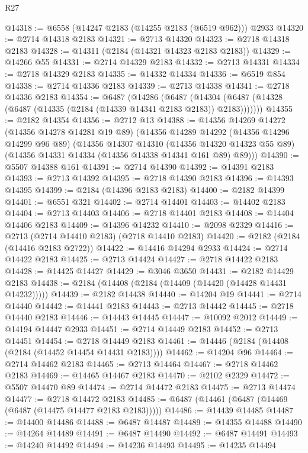 \begin{lexlean}{R27}
\begin{coremodule}
@14318 := @6558 (@14247 @2183 (@14255 @2183 (@6519 @962))) @2933
@14320 := @2714 @14318 @2183
@14321 := @2713 @14320
@14323 := @2718 @14318 @2183
@14328 := @14311 (@2184 (@14321 @14323 @2183 @2183))
@14329 := @14266 @55
@14331 := @2714 @14329 @2183
@14332 := @2713 @14331
@14334 := @2718 @14329 @2183
@14335 := @14332 @14334
@14336 := @6519 @854
@14338 := @2714 @14336 @2183
@14339 := @2713 @14338
@14341 := @2718 @14336 @2183
@14354 := @6487
    (@14286
      (@6487 (@14304 (@6487 (@14328 (@6487 (@14335 (@2184 (@14339 @14341 @2183 @2183)) @2183)))))))
@14355 := @2182 @14354
@14356 := @2712 @13
@14388 := @14356
    @14269
    @14272
    (@14356 @14278 @14281 @19 @89)
    (@14356
      @14289
      @14292
      (@14356 @14296 @14299 @96 @89)
      (@14356
        @14307
        @14310
        (@14356 @14320 @14323 @55 @89)
        (@14356 @14331 @14334 (@14356 @14338 @14341 @161 @89) @89)))
@14390 := @5507 @14388 @161
@14391 := @2714 @14390
@14392 := @14391 @2183
@14393 := @2713 @14392
@14395 := @2718 @14390 @2183
@14396 := @14393 @14395
@14399 := @2184 (@14396 @2183 @2183)
@14400 := @2182 @14399
@14401 := @6551 @321
@14402 := @2714 @14401
@14403 := @14402 @2183
@14404 := @2713 @14403
@14406 := @2718 @14401 @2183
@14408 := @14404 @14406 @2183
@14409 := @14396 @14232
@14410 := @2098 @2329
@14416 := @2713 (@2714 @14410 @2183) (@2718 @14410 @2183)
@14420 := @2182 (@2184 (@14416 @2183 @2722))
@14422 := @14416 @14294 @2933
@14424 := @2714 @14422 @2183
@14425 := @2713 @14424
@14427 := @2718 @14422 @2183
@14428 := @14425 @14427
@14429 := @3046 @3650
@14431 := @2182 @14429 @2183
@14438 := @2184 (@14408 (@2184 (@14409 (@14420 (@14428 @14431 @14232)))))
@14439 := @2182 @14438
@14440 := @14204 @19
@14441 := @2714 @14440
@14442 := @14441 @2183
@14443 := @2713 @14442
@14445 := @2718 @14440 @2183
@14446 := @14443 @14445
@14447 := @10092 @2012
@14449 := @14194 @14447 @2933
@14451 := @2714 @14449 @2183
@14452 := @2713 @14451
@14454 := @2718 @14449 @2183
@14461 := @14446 (@2184 (@14408 (@2184 (@14452 @14454 @14431 @2183))))
@14462 := @14204 @96
@14464 := @2714 @14462 @2183
@14465 := @2713 @14464
@14467 := @2718 @14462 @2183
@14469 := @14465 @14467 @2183
@14470 := @2102 @2329
@14472 := @5507 @14470 @89
@14474 := @2714 @14472 @2183
@14475 := @2713 @14474
@14477 := @2718 @14472 @2183
@14485 := @6487 (@14461 (@6487 (@14469 (@6487 (@14475 @14477 @2183 @2183)))))
@14486 := @14439 @14485
@14487 := @14400 @14486
@14488 := @6487 @14487
@14489 := @14355 @14488
@14490 := @14264 @14489
@14491 := @6487 @14490
@14492 := @6487 @14491
@14493 := @14240 @14492
@14494 := @14236 @14493
@14495 := @14235 @14494

\end{coremodule}
\end{lexlean}

